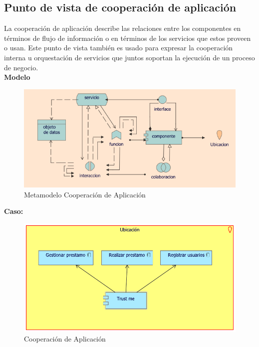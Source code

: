 	\subsection{Punto de vista de cooperación de aplicación}
	{La  cooperación de aplicación describe las relaciones entre los componentes en términos de flujo de información o en términos de los servicios que estos proveen o usan. Este punto de vista también es usado para expresar la cooperación interna u orquestación de servicios que juntos soportan la ejecución de un proceso de negocio.\\
		
		\textbf{Modelo}\\
		\begin{figure}[H]
			\centering
			\includegraphics[width=0.8\linewidth]{development/cooperacionapp.png}
			\caption{Metamodelo Cooperación de Aplicación}
		\end{figure}
		
		\textbf{Caso:} 
		
		\begin{figure}[H]
			\centering
			\includegraphics[width=0.8\linewidth]{development/cooperacionapp.pdf}
			\caption{Cooperación de Aplicación}
		\end{figure}
	}
	
